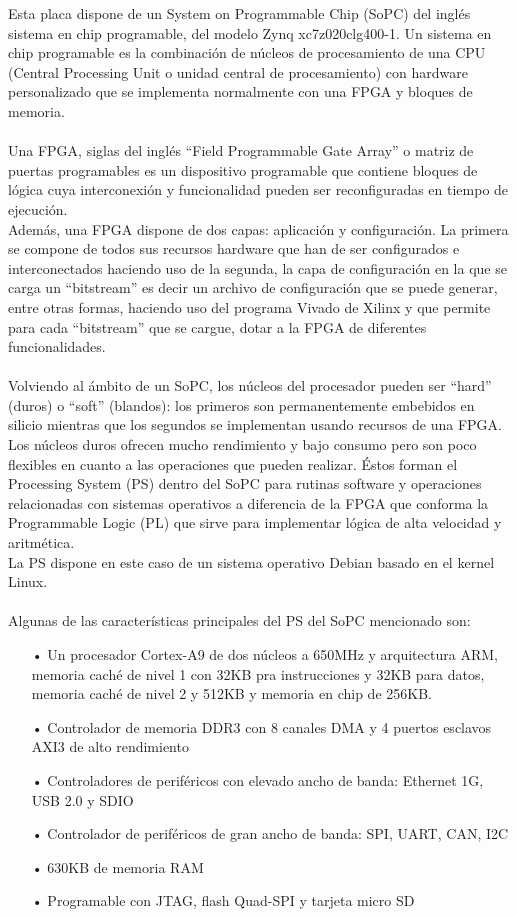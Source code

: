 Esta placa dispone de un System on Programmable Chip (SoPC) del inglés sistema en chip programable, del modelo Zynq xc7z020clg400-1. Un sistema en chip programable es la combinación de núcleos de procesamiento de una CPU (Central Processing Unit o unidad central de procesamiento) con hardware personalizado que se implementa normalmente con una FPGA y bloques de memoria.
\\
\\
Una FPGA, siglas del inglés ``Field Programmable Gate Array'' o matriz de puertas programables es un dispositivo programable que contiene bloques de lógica cuya interconexión y funcionalidad pueden ser reconfiguradas en tiempo de ejecución.
\\
Además, una FPGA dispone de dos capas: aplicación y configuración. La primera se compone de todos sus recursos hardware que han de ser configurados e interconectados haciendo uso de la segunda, la capa de configuración en la que se carga un ``bitstream'' es decir un archivo de configuración que se puede generar, entre otras formas, haciendo uso del programa Vivado de Xilinx y que permite para cada ``bitstream'' que se cargue, dotar a la FPGA de diferentes funcionalidades.
\\
\\
Volviendo al ámbito de un SoPC, los núcleos del procesador pueden ser ``hard'' (duros) o ``soft'' (blandos): los primeros son permanentemente embebidos en silicio mientras que los segundos se implementan usando recursos de una FPGA. 
\\
Los núcleos duros ofrecen mucho rendimiento y bajo consumo pero son poco flexibles en cuanto a las operaciones que pueden realizar. Éstos forman el Processing System (PS) dentro del SoPC para rutinas software y operaciones relacionadas con sistemas operativos a diferencia de la FPGA que conforma la Programmable Logic (PL) que sirve para implementar lógica de alta velocidad y aritmética.
\\
La PS dispone en este caso de un sistema operativo Debian basado en el kernel Linux.
\\
\\
Algunas de las características principales del PS del SoPC mencionado son:

\begin{itemize}
\item[•] Un procesador Cortex-A9 de dos núcleos a 650MHz y arquitectura ARM, memoria caché de nivel 1 con 32KB pra instrucciones y 32KB para datos, memoria caché de nivel 2 y 512KB y memoria en chip de 256KB.
\item[•] Controlador de memoria DDR3 con 8 canales DMA y 4 puertos esclavos AXI3 de alto rendimiento
\item[•] Controladores de periféricos con elevado ancho de banda: Ethernet 1G, USB 2.0 y SDIO 
\item[•] Controlador de periféricos de gran ancho de banda: SPI, UART, CAN, I2C
\item[•] 630KB de memoria RAM
\item[•] Programable con JTAG, flash Quad-SPI y tarjeta micro SD
\end{itemize}


